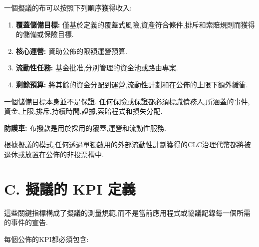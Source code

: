 \documentclass[11pt]{article}
\begin{document}
一個擬議的布可以按照下列順序獲得收入:

\begin{enumerate}[leftmargin=*]
\item \textbf{覆蓋儲備目標:} 僅基於定義的覆蓋式風險,資產符合條件,排斥和索賠規則而獲得的儲備或保險目標.
\item \textbf{核心運營:} 資助公佈的限額運營預算.
\item \textbf{流動性任務:} 基金批准,分別管理的資金池或路由專案.
\item \textbf{剩餘預算:} 將其餘的資金分配到運營,流動性計劃和在公佈的上限下額外緩衝.
\end{enumerate}
一個儲備目標本身並不是保證. 任何保險或保證都必須標識債務人,所涵蓋的事件,資金,上限,排斥,持續時間,證據,索賠程式和損失分配.

\textbf{防護車:} 布撥款是用於採用的覆蓋,運營和流動性服務.

根據擬議的模式,任何透過單獨啟用的外部流動性計劃獲得的CLC治理代幣都將被退休或放置在公佈的非投票槽中.


\section*{C. 擬議的 KPI 定義}

這些關鍵指標構成了擬議的測量規範,而不是當前應用程式或協議記錄每一個所需的事件的宣告.

每個公佈的KPI都必須包含:
\end{document}
